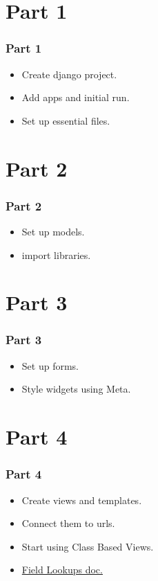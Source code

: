 \documentclass{beamer}
\begin{document}
\section{Part 1}
\begin{frame}
	\frametitle{Part 1}
	\begin{itemize}
		\item Create django project.
		\item Add apps and initial run.
		\item Set up essential files.
	\end{itemize}
\end{frame}

\section{Part 2}
\begin{frame}
	\frametitle{Part 2}
	\begin{itemize}
		\item Set up models.
		\item import libraries.
		
	\end{itemize}
\end{frame}

\section{Part 3}
\begin{frame}
	\frametitle{Part 3}
	\begin{itemize}
		\item Set up forms.
		\item Style widgets using Meta.
		
	\end{itemize}
\end{frame}

\section{Part 4}
\begin{frame}[fragile]
	\frametitle{Part 4}
	\begin{itemize}
		\item Create views and templates.
		\item Connect them to urls.
		\item Start using Class Based Views.
		\item \href{https://docs.djangoproject.com/en/2.1/ref/models/querysets/#id4}{Field Lookups doc.}
	\end{itemize}
	
\end{frame}
\end{document}
